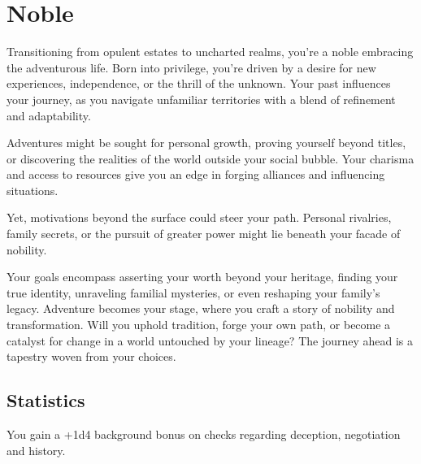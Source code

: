 \section{Noble}\label{background:noble}
Transitioning from opulent estates to uncharted realms, you're a noble embracing the adventurous life.
Born into privilege, you're driven by a desire for new experiences, independence, or the thrill of the unknown.
Your past influences your journey, as you navigate unfamiliar territories with a blend of refinement and adaptability.

Adventures might be sought for personal growth, proving yourself beyond titles, or discovering the realities of the world outside your social bubble.
Your charisma and access to resources give you an edge in forging alliances and influencing situations.

Yet, motivations beyond the surface could steer your path.
Personal rivalries, family secrets, or the pursuit of greater power might lie beneath your facade of nobility.

Your goals encompass asserting your worth beyond your heritage, finding your true identity, unraveling familial mysteries, or even reshaping your family's legacy.
Adventure becomes your stage, where you craft a story of nobility and transformation.
Will you uphold tradition, forge your own path, or become a catalyst for change in a world untouched by your lineage?
The journey ahead is a tapestry woven from your choices.

\subsection{Statistics}
You gain a +1d4 background bonus on checks regarding deception, negotiation and history.
